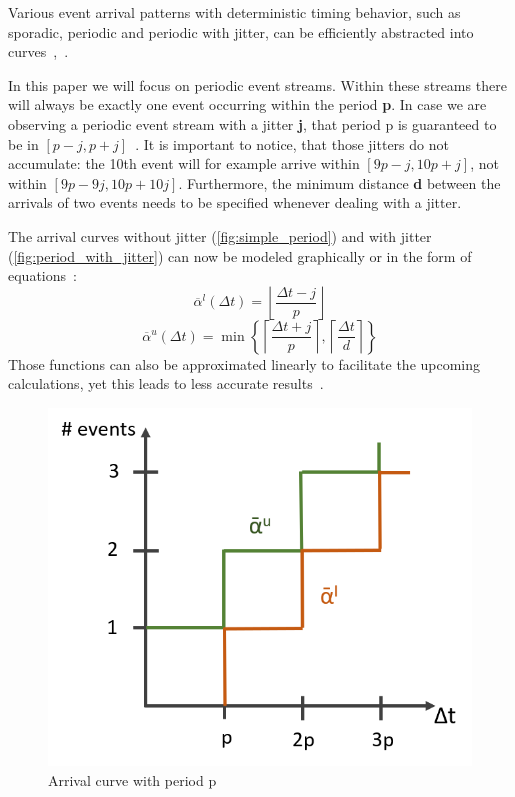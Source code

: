 
Various event arrival patterns with deterministic timing behavior, such as sporadic, periodic and periodic with jitter, can be efficiently abstracted into curves~\cite{cha},~\cite{wan:12}.

In this paper we will focus on periodic event streams.
Within these streams there will always be exactly one event occurring within the period \textbf{p}.
In case we are observing a periodic event stream with a jitter \textbf{j}, that period p is guaranteed to be in \([p-j,p+j]\)~\cite{mar}.
It is important to notice, that those jitters do not accumulate: the 10th event will for example arrive within \([9p-j,10p+j]\), not within \([9p-9j,10p+10j]\).
Furthermore, the minimum distance \textbf{d} between the arrivals of two events needs to be specified whenever dealing with a jitter.

The arrival curves without jitter (\autoref{fig:simple_period}) and with jitter (\autoref{fig:period_with_jitter}) can now be modeled graphically or in the form of equations~\cite{wan:12}:
\[\overline{\alpha}^{l}(\Delta t)=\left\lfloor\frac{\Delta t-j}{p}\right\rfloor\]
\[\overline{\alpha}^{u}(\Delta t)=\min{\left\{\left\lceil\frac{\Delta t+j}{p}\right\rceil,\left\lceil\frac{\Delta t}{d}\right\rceil\right\}}\]
Those functions can also be approximated linearly to facilitate the upcoming calculations, yet this leads to less accurate results~\cite{wan:06}.

\begin{figure}
    \centering
    \includegraphics[width=0.7\columnwidth]{graphics/simple_period.png}
    \caption{Arrival curve with period p}\label{fig:simple_period}
\end{figure}

